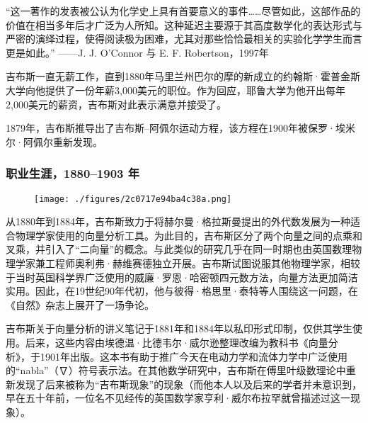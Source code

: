 “这一著作的发表被公认为化学史上具有首要意义的事件……尽管如此，这部作品的价值在相当多年后才广泛为人所知。这种延迟主要源于其高度数学化的表达形式与严密的演绎过程，使得阅读极为困难，尤其对那些恰恰最相关的实验化学学生而言更是如此。”
——J. J. O'Connor 与 E. F. Robertson，1997年

吉布斯一直无薪工作，直到1880年马里兰州巴尔的摩的新成立的约翰斯·霍普金斯大学向他提供了一份年薪3,000美元的职位。作为回应，耶鲁大学为他开出每年2,000美元的薪资，吉布斯对此表示满意并接受了。

1879年，吉布斯推导出了吉布斯–阿佩尔运动方程，该方程在1900年被保罗·埃米尔·阿佩尔重新发现。
\subsubsection{职业生涯，1880–1903 年}
\begin{figure}[ht]
\centering
\texttt{[image: ./figures/2c0717e94ba4c38a.png]}
\caption{} \label{fig_QSY_4}
\end{figure}
从1880年到1884年，吉布斯致力于将赫尔曼·格拉斯曼提出的外代数发展为一种适合物理学家使用的向量分析工具。为此目的，吉布斯区分了两个向量之间的点乘和叉乘，并引入了“二向量”的概念。与此类似的研究几乎在同一时期也由英国数理物理学家兼工程师奥利弗·赫维赛德独立开展。吉布斯试图说服其他物理学家，相较于当时英国科学界广泛使用的威廉·罗恩·哈密顿四元数方法，向量方法更加简洁实用。因此，在19世纪90年代初，他与彼得·格思里·泰特等人围绕这一问题，在《自然》杂志上展开了一场争论。

吉布斯关于向量分析的讲义笔记于1881年和1884年以私印形式印制，仅供其学生使用。后来，这些内容由埃德温·比德韦尔·威尔逊整理改编为教科书《向量分析》，于1901年出版。这本书有助于推广今天在电动力学和流体力学中广泛使用的“nabla”（∇）符号表示法。在其他数学研究中，吉布斯在傅里叶级数理论中重新发现了后来被称为“吉布斯现象”的现象（而他本人以及后来的学者并未意识到，早在五十年前，一位名不见经传的英国数学家亨利·威尔布拉罕就曾描述过这一现象）。
